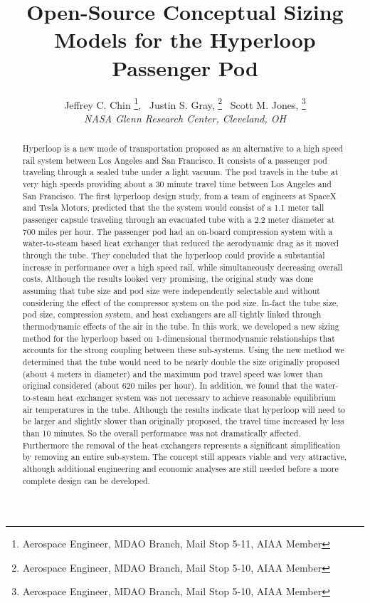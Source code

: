 \documentclass[]             %
{aiaa-tc}                       %
\title{Open-Source Conceptual Sizing Models for the Hyperloop Passenger Pod}
\author{
  Jeffrey C. Chin%
     \thanks{Aerospace Engineer, MDAO Branch, Mail Stop 5-11, AIAA Member},
  \ Justin S. Gray,%
     \thanks{Aerospace Engineer, MDAO Branch, Mail Stop 5-10, AIAA Member}
  \ Scott M. Jones,%
     \thanks{Aerospace Engineer, MDAO Branch, Mail Stop 5-10, AIAA Member}
   \\
  {\normalsize\itshape
  NASA Glenn Research Center, Cleveland, OH}
}
\begin{document}
\maketitle

\begin{abstract}
Hyperloop is a new mode of transportation proposed as an alternative to a high speed rail system between Los Angeles and San Francisco. It consists of a passenger pod traveling through a sealed tube under a light vacuum. The pod travels in the tube at very high speeds providing about a 30 minute travel time between Los Angeles and San Francisco. The first hyperloop design study, from a team of engineers at SpaceX and Tesla Motors, predicted that the the system would consist of a 1.1 meter tall passenger capsule traveling through an evacuated tube with a 2.2 meter diameter at 700 miles per hour. The passenger pod had an on-board compression system with a water-to-steam based heat exchanger  that reduced the aerodynamic drag as it moved through the tube. They concluded that the hyperloop could provide a substantial increase in performance over a high speed rail, while simultaneously decreasing overall costs. Although the results looked very promising, the original study was done assuming that tube size and pod size were independently selectable and without considering the effect of the compressor system on the pod size. In-fact the tube size, pod size, compression system, and heat exchangers are all tightly linked through thermodynamic effects of the air in the tube. In this work, we developed a new sizing method for the hyperloop based on 1-dimensional thermodynamic relationships that accounts for the strong coupling between these sub-systems. Using the new method we determined that the tube would need to be nearly double the size originally proposed (about 4 meters in diameter) and the maximum pod travel speed was lower than original considered (about 620 miles per hour). In addition, we found that the water-to-steam heat exchanger system was not necessary to achieve reasonable equilibrium air temperatures in the tube. Although the results indicate that hyperloop will need to be larger and slightly slower than originally proposed, the travel time increased by less than 10 minutes. So the overall performance was not dramatically affected. Furthermore the removal of the heat exchangers represents a significant simplification by removing an entire sub-system. The concept still appears viable and very attractive, although additional engineering and economic analyses are still needed before a more complete design can be developed.


\end{abstract}  

\setcounter{secnumdepth}{1}
\setcounter{tocdepth}{1}
\printnomenclature
 





\end{document}
